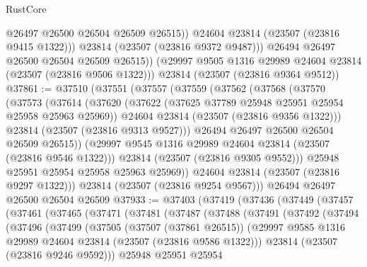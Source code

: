 \begin{lexlean}{RustCore}
\begin{coremodule}
                @26497
                @26500
                @26504
                @26509
                @26515))
            @24604
            @23814
            (@23507 (@23816 @9415 @1322)))
          @23814
          (@23507 (@23816 @9372 @9487)))
        @26494
        @26497
        @26500
        @26504
        @26509
        @26515))
    (@29997 @9505 @1316 @29989 @24604 @23814 (@23507 (@23816 @9506 @1322)))
    @23814
    (@23507 (@23816 @9364 @9512))
@37861 := @37510
    (@37551
      (@37557
        (@37559
          (@37562
            (@37568
              (@37570
                (@37573
                  (@37614
                    (@37620
                      (@37622 (@37625 @37789 @25948 @25951 @25954 @25958 @25963 @25969))
                      @24604
                      @23814
                      (@23507 (@23816 @9356 @1322)))
                    @23814
                    (@23507 (@23816 @9313 @9527)))
                  @26494
                  @26497
                  @26500
                  @26504
                  @26509
                  @26515))
              (@29997 @9545 @1316 @29989 @24604 @23814 (@23507 (@23816 @9546 @1322)))
              @23814
              (@23507 (@23816 @9305 @9552)))
            @25948
            @25951
            @25954
            @25958
            @25963
            @25969))
        @24604
        @23814
        (@23507 (@23816 @9297 @1322)))
      @23814
      (@23507 (@23816 @9254 @9567)))
    @26494
    @26497
    @26500
    @26504
    @26509
@37933 := @37403
    (@37419
      (@37436
        (@37449
          (@37457
            (@37461
              (@37465
                (@37471
                  (@37481
                    (@37487
                      (@37488
                        (@37491
                          (@37492
                            (@37494
                              (@37496
                                (@37499
                                  (@37505
                                    (@37507 (@37861 @26515))
                                    (@29997
                                      @9585
                                      @1316
                                      @29989
                                      @24604
                                      @23814
                                      (@23507 (@23816 @9586 @1322)))
                                    @23814
                                    (@23507 (@23816 @9246 @9592)))
                                  @25948
                                  @25951
                                  @25954

\end{coremodule}
\end{lexlean}
